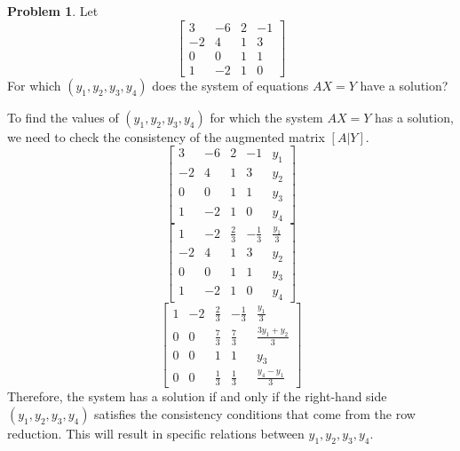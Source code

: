 \documentclass[12pt]{article}
\theoremstyle{definition}
\newtheorem{problem}{Problem}
\begin{document}
\begin{problem}
    Let
    \[
    \begin{bmatrix}
        3 & -6 & 2 & -1\\
        -2 & 4 & 1 & 3\\
        0 & 0 & 1 & 1\\
        1 & -2 & 1 & 0
    \end{bmatrix}
    \]
    For which $(y_1, y_2, y_3, y_4)$ does the system of equations $AX = Y$ have a solution?

    \begin{solution}
        To find the values of \( (y_1, y_2, y_3, y_4) \) for which the system \( AX = Y \) has a solution, we need to check the consistency of the augmented matrix \( [A|Y] \).
        \[
        \left[ \begin{array}{cccc|c}
        3 & -6 & 2 & -1 & y_1 \\
        -2 & 4 & 1 & 3 & y_2 \\
        0 & 0 & 1 & 1 & y_3 \\
        1 & -2 & 1 & 0 & y_4
        \end{array} \right]
        \]
        \[
        \left[ \begin{array}{cccc|c}
        1 & -2 & \frac{2}{3} & -\frac{1}{3} & \frac{y_1}{3} \\
        -2 & 4 & 1 & 3 & y_2 \\
        0 & 0 & 1 & 1 & y_3 \\
        1 & -2 & 1 & 0 & y_4
        \end{array} \right]
        \]
        \[
        \left[ \begin{array}{cccc|c}
        1 & -2 & \frac{2}{3} & -\frac{1}{3} & \frac{y_1}{3} \\
        0 & 0 & \frac{7}{3} & \frac{7}{3} & \frac{3y_1 + y_2}{3} \\
        0 & 0 & 1 & 1 & y_3 \\
        0 & 0 & \frac{1}{3} & \frac{1}{3} & \frac{y_4 - y_1}{3}
        \end{array} \right]
        \]
        Therefore, the system has a solution if and only if the right-hand side \( (y_1, y_2, y_3, y_4) \) satisfies the consistency conditions that come from the row reduction. This will result in specific relations between \( y_1, y_2, y_3, y_4 \).
    \end{solution}
\end{problem}
\end{document}
